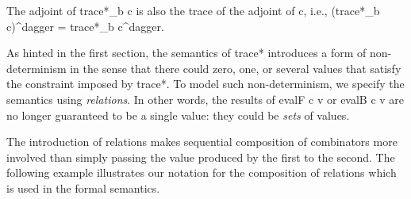 \documentclass{llncs}
\begin{document}
The adjoint of {{trace*_{b} c}} is also the trace of the adjoint of
{{c}}, i.e., {{(trace*_{b} c)^dagger = trace*_{b} c^dagger}}.

As hinted in the first section, the semantics of {{trace*}} introduces
a form of non-determinism in the sense that there could zero, one, or
several values that satisfy the constraint imposed by {{trace*}}. To
model such non-determinism, we specify the semantics using
\emph{relations}. In other words, the results of {{evalF c v}} 
or {{evalB c v}} are no longer guaranteed to be a single value: they 
could be \emph{sets} of values. 

The introduction of relations makes sequential composition of
combinators more involved than simply passing the value produced by
the first to the second. The following example illustrates our
notation for the composition of relations which is used in the formal
semantics. 
\end{document}
